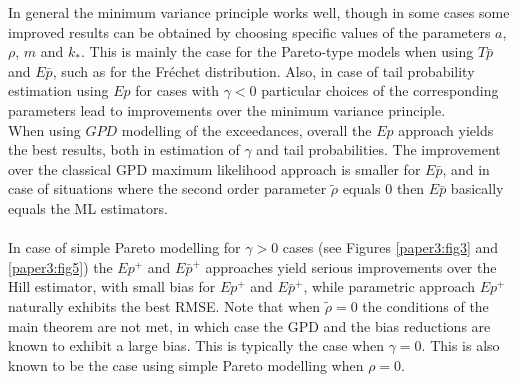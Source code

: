 In general the minimum variance principle works well, though in some cases some improved results can be obtained by choosing specific values of the parameters $a$, $\rho$, $m$ and $k_*$. This is mainly the case for the Pareto-type models when using $T\bar{p}$ and $E\bar{p}$, such as for the Fr\'echet distribution. Also, in case of tail probability estimation using $Ep$ for cases with $\gamma <0$ particular choices of the corresponding parameters lead to improvements over the minimum variance principle.
\\
When using $GPD$ modelling of the exceedances, overall the $Ep$ approach yields the best results, both in estimation of $\gamma$ and tail probabilities. The improvement over the classical GPD maximum likelihood approach is smaller for $E\bar{p}$, and in case of situations where the second order parameter $\tilde\rho$ equals 0 then $E\bar{p}$ basically equals the ML estimators. 
\\\\
In case of simple Pareto modelling for $\gamma >0$ cases (see Figures \ref{paper3:fig3} and \ref{paper3:fig5}) the $Ep^+$ and $E\bar{p}^+$ approaches yield serious improvements over the Hill estimator, with small bias for $Ep^+$ and $E\bar{p}^+$, while parametric approach $Ep^+$ naturally exhibits the best RMSE. Note that when $\tilde\rho=0$ the conditions of the main theorem are not met, in which case the GPD and the bias reductions are known to exhibit a large bias. This is typically the case when $\gamma=0$. This is also known to be the case using simple Pareto modelling when $\rho=0$.\\
 

